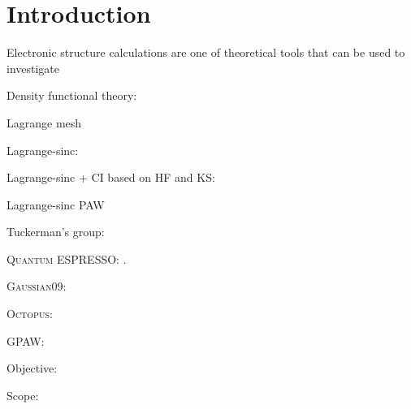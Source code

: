 \section{Introduction}

Electronic structure calculations are one of theoretical tools that can be used to
investigate

Density functional theory: \cite{Hohenberg1964,Kohn1965}

Lagrange mesh \cite{Baye2015}

Lagrange-sinc: \cite{Choi2015,Choi2016}

Lagrange-sinc + CI based on HF and KS: \cite{Kim2015}

Lagrange-sinc PAW \cite{Kang2016}

Tuckerman's group: \cite{HeeSeungLee2005,HeeSeungLee2006,HeeSeungLee2008}

\textsc{Quantum ESPRESSO}: \cite{Giannozzi2009,Giannozzi2017}.

\textsc{Gaussian09}: \cite{Gaussian2009}

\textsc{Octopus}: \cite{Marques2003,Castro2006,Xavier2015}

GPAW: \cite{Enkovaara2010}

Objective:

Scope: